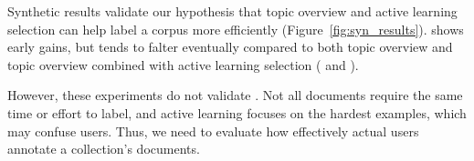 Synthetic results validate our hypothesis that topic overview and active learning selection can help label a corpus more efficiently
(Figure~\ref{fig:syn_results}).   shows early gains, but
tends to falter eventually compared to both topic overview and topic overview  combined with active learning selection ( and ).


However, these experiments do not validate \name{}.  Not all documents
require the same time or effort to label, and active learning focuses
on the hardest examples, which may confuse users.  Thus, we need to
evaluate how effectively actual users annotate a collection's
documents.
